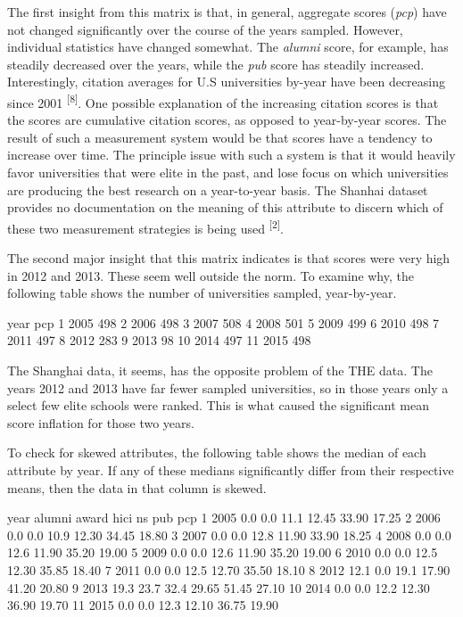 \documentclass[12pt]{article}
\begin{document}
The first insight from this matrix is that, in general, aggregate scores (\textit{pcp}) have not changed significantly over the course of the years sampled. However, individual statistics have changed somewhat. The \textit{alumni} score, for example, has steadily decreased over the years, while the \textit{pub} score has steadily increased. Interestingly, citation averages for U.S universities by-year have been decreasing since 2001 \textsuperscript{[8]}. One possible explanation of the increasing citation scores is that the scores are cumulative citation scores, as opposed to year-by-year scores. The result of such a measurement system would be that scores have a tendency to increase over time. The principle issue with such a system is that it would heavily favor universities that were elite in the past, and lose focus on which universities are producing the best research on a year-to-year basis. The Shanhai dataset provides no documentation on the meaning of this attribute to discern which of these two measurement strategies is being used \textsuperscript{[2]}.

The second major insight that this matrix indicates is that scores were very high in 2012 and 2013. These seem well outside the norm. To examine why, the following table shows the number of universities sampled, year-by-year.

\begin{Schunk}
\begin{Soutput}
   year pcp
1  2005 498
2  2006 498
3  2007 508
4  2008 501
5  2009 499
6  2010 498
7  2011 497
8  2012 283
9  2013  98
10 2014 497
11 2015 498
\end{Soutput}
\end{Schunk}

The Shanghai data, it seems, has the opposite problem of the THE data. The years 2012 and 2013 have far fewer sampled universities, so in those years only a select few elite schools were ranked. This is what caused the significant mean score inflation for those two years.

To check for skewed attributes, the following table shows the median of each attribute by year. If any of these medians significantly differ from their respective means, then the data in that column is skewed.
\begin{Schunk}
\begin{Soutput}
   year alumni award hici    ns   pub   pcp
1  2005    0.0   0.0 11.1 12.45 33.90 17.25
2  2006    0.0   0.0 10.9 12.30 34.45 18.80
3  2007    0.0   0.0 12.8 11.90 33.90 18.25
4  2008    0.0   0.0 12.6 11.90 35.20 19.00
5  2009    0.0   0.0 12.6 11.90 35.20 19.00
6  2010    0.0   0.0 12.5 12.30 35.85 18.40
7  2011    0.0   0.0 12.5 12.70 35.50 18.10
8  2012   12.1   0.0 19.1 17.90 41.20 20.80
9  2013   19.3  23.7 32.4 29.65 51.45 27.10
10 2014    0.0   0.0 12.2 12.30 36.90 19.70
11 2015    0.0   0.0 12.3 12.10 36.75 19.90
\end{Soutput}
\end{Schunk}
\end{document}
